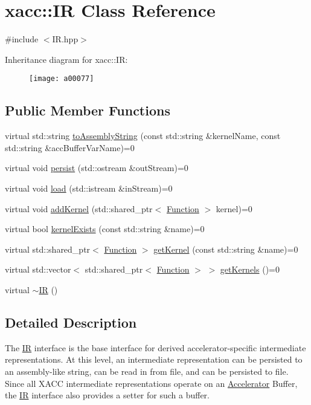 \hypertarget{a00077}{}\section{xacc\+:\+:IR Class Reference}
\label{a00077}


{\ttfamily \#include $<$I\+R.\+hpp$>$}

Inheritance diagram for xacc\+:\+:IR\+:\begin{figure}[H]
\begin{center}
\leavevmode
\texttt{[image: a00077]}
\end{center}
\end{figure}
\subsection*{Public Member Functions}
\begin{DoxyCompactItemize}
\item 
virtual std\+::string \hyperlink{a00077_a8356cdff1919b88eabeb84fd7450cdb6}{to\+Assembly\+String} (const std\+::string \&kernel\+Name, const std\+::string \&acc\+Buffer\+Var\+Name)=0
\item 
virtual void \hyperlink{a00077_a414b72224d88473ad6190bb88102a3ea}{persist} (std\+::ostream \&out\+Stream)=0
\item 
virtual void \hyperlink{a00077_a444c2e4dc0faac500fb70fa93997e9bc}{load} (std\+::istream \&in\+Stream)=0
\item 
virtual void \hyperlink{a00077_abbbf8e6993c518597de32cd05d49d737}{add\+Kernel} (std\+::shared\+\_\+ptr$<$ \hyperlink{a00059}{Function} $>$ kernel)=0
\item 
virtual bool \hyperlink{a00077_afc9ccf5126f3fed19c2e879133b2f6d8}{kernel\+Exists} (const std\+::string \&name)=0
\item 
virtual std\+::shared\+\_\+ptr$<$ \hyperlink{a00059}{Function} $>$ \hyperlink{a00077_a6f49b4ba4b3a15142b04873284885f0d}{get\+Kernel} (const std\+::string \&name)=0
\item 
virtual std\+::vector$<$ std\+::shared\+\_\+ptr$<$ \hyperlink{a00059}{Function} $>$ $>$ \hyperlink{a00077_a88c50bfc5b279145360ddc0c3a703b9b}{get\+Kernels} ()=0
\item 
virtual \hyperlink{a00077_a09a76d71092254acae07e19fa2f34921}{$\sim$\+IR} ()
\end{DoxyCompactItemize}


\subsection{Detailed Description}
The \hyperlink{a00077}{IR} interface is the base interface for derived accelerator-\/specific intermediate representations. At this level, an intermediate representation can be persisted to an assembly-\/like string, can be read in from file, and can be persisted to file. Since all X\+A\+CC intermediate representations operate on an \hyperlink{a00017}{Accelerator} Buffer, the \hyperlink{a00077}{IR} interface also provides a setter for such a buffer. 

